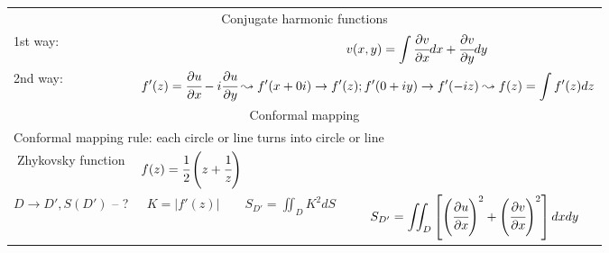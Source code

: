 \vspace{10ex}

\begin{tabular}{|cccc|}


	\multicolumn{4}{|c|}{Conjugate harmonic functions} \\
	\multicolumn{2}{|l}{1st way:} &
	\multicolumn{2}{c|}{$\displaystyle v(x, y) = \int \cfrac{\partial v}{\partial x} dx + \cfrac{\partial v}{\partial y} dy$} \\

	\multicolumn{1}{|l}{2nd way:} &
	\multicolumn{3}{c|}{
	$\displaystyle f'(z) = \cfrac{\partial u}{\partial x} -i\cfrac{\partial u}{\partial y} \leadsto
	f'(x + 0i) \rightarrow f'(z); f'(0 + iy) \rightarrow f'(-iz) \leadsto
	f(z) = \int f'(z)dz$} \\
	\hline

	\multicolumn{4}{|c|}{Conformal mapping} \\

	\multicolumn{4}{|l|}{Conformal mapping rule: each circle or line turns into circle or line} \\

	Zhykovsky function &
	\multicolumn{3}{l|}{$\displaystyle f(z) = \cfrac{1}{2}\left( z + \cfrac{1}{z} \right)$} \\

	$\displaystyle D \rightarrow D', S(D')$ -- ? &
	$\displaystyle K = |f'(z)|$ &
	$\displaystyle S_{D'} = \iint_{D}K^2dS$ &
	$\displaystyle S_{D'} = \iint_{D}\left[\left(\cfrac{\partial u}{\partial x}\right)^2 + \left(\cfrac{\partial v}{\partial x}\right)^2\right]dxdy$ \\
	\hline
\end{tabular}